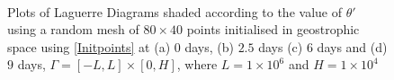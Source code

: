\begin{figure}[ht!]
	\centering
	\\
	\caption{Plots of Laguerre Diagrams shaded according to the value of $\theta '$ using a random mesh of $80 \times 40$ points initialised in geostrophic space using \ref{Initpoints} at (a) $0$ days, (b) $2.5$ days (c) $6$ days and (d) $9$ days, $\Gamma = [-L,L]\times[0,H]$, where $L = 1\times10^6$ and $H = 1\times10^4$}
	\label{fig: thetap ldiag1}
\end{figure}
